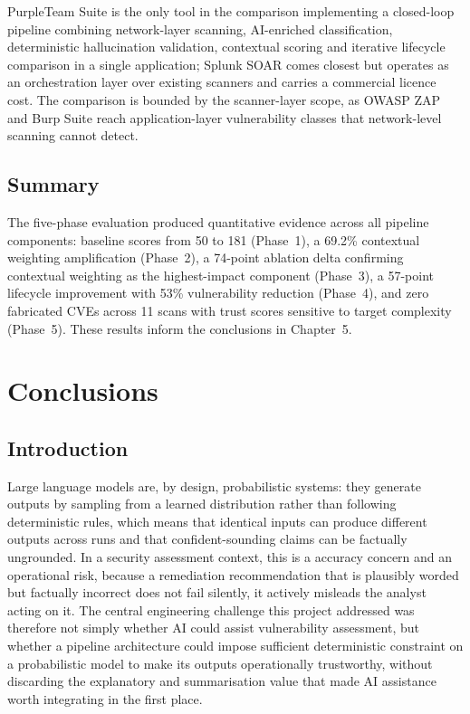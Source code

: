 \documentclass[12pt, a4paper, oneside]{report}
\begin{document}
PurpleTeam Suite is the only tool in the comparison implementing a closed-loop pipeline combining network-layer scanning, AI-enriched classification, deterministic hallucination validation, contextual scoring and iterative lifecycle comparison in a single application; Splunk SOAR comes closest but operates as an orchestration layer over existing scanners and carries a commercial licence cost. The comparison is bounded by the scanner-layer scope, as OWASP ZAP and Burp Suite reach application-layer vulnerability classes that network-level scanning cannot detect.


\section{Summary}
\label{sec:ch4-summary}

The five-phase evaluation produced quantitative evidence across all pipeline components: baseline scores from 50 to 181 (Phase~1), a 69.2\% contextual weighting amplification (Phase~2), a 74-point ablation delta confirming contextual weighting as the highest-impact component (Phase~3), a 57-point lifecycle improvement with 53\% vulnerability reduction (Phase~4), and zero fabricated CVEs across 11 scans with trust scores sensitive to target complexity (Phase~5). These results inform the conclusions in Chapter~5.



\chapter{Conclusions}

\section{Introduction}
\label{sec:ch5-intro}

Large language models are, by design, probabilistic systems: they generate outputs by sampling from a learned distribution rather than following deterministic rules, which means that identical inputs can produce different outputs across runs and that confident-sounding claims can be factually ungrounded. In a security assessment context, this is a accuracy concern and an operational risk, because a remediation recommendation that is plausibly worded but factually incorrect does not fail silently, it actively misleads the analyst acting on it. The central engineering challenge this project addressed was therefore not simply whether AI could assist vulnerability assessment, but whether a pipeline architecture could impose sufficient deterministic constraint on a probabilistic model to make its outputs operationally trustworthy, without discarding the explanatory and summarisation value that made AI assistance worth integrating in the first place.
\end{document}
